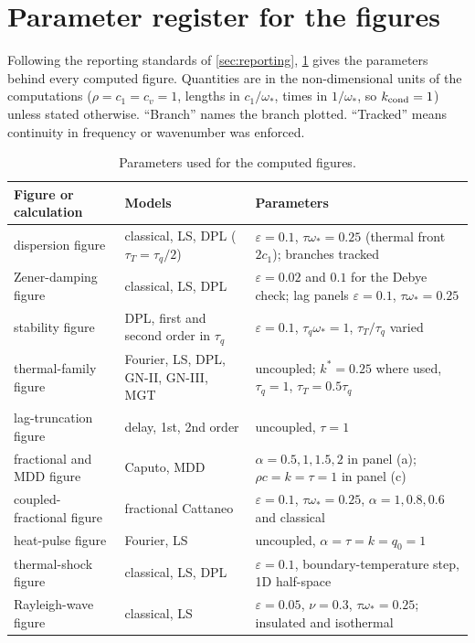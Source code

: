 \section{Parameter register for the figures}\label{app:params}

Following the reporting standards of \cref{sec:reporting}, \cref{tab:paramreg} gives the parameters behind every computed figure. Quantities are in the non-dimensional units of the computations ($\rho=c_1=c_v=1$, lengths in $c_1/\omega_*$, times in $1/\omega_*$, so $k_{\rm cond}=1$) unless stated otherwise. ``Branch'' names the branch plotted. ``Tracked'' means continuity in frequency or wavenumber was enforced.

\begin{table}[H]\centering\scriptsize
\caption{Parameters used for the computed figures.}\label{tab:paramreg}
\setlength{\tabcolsep}{3pt}
\begin{tabularx}{\textwidth}{@{}p{4.0cm}p{3.0cm}X@{}}\toprule
Figure or calculation & Models & Parameters\\\midrule
dispersion figure & classical, LS, DPL ($\tau_T=\tau_q/2$) & $\varepsilon=0.1$, $\tau\omega_*=0.25$ (thermal front $2c_1$); branches tracked\\
Zener-damping figure & classical, LS, DPL & $\varepsilon=0.02$ and $0.1$ for the Debye check; lag panels $\varepsilon=0.1$, $\tau\omega_*=0.25$\\
stability figure & DPL, first and second order in $\tau_q$ & $\varepsilon=0.1$, $\tau_q\omega_*=1$, $\tau_T/\tau_q$ varied\\
thermal-family figure & Fourier, LS, DPL, GN-II, GN-III, MGT & uncoupled; $k^*=0.25$ where used, $\tau_q=1$, $\tau_T=0.5\tau_q$\\
lag-truncation figure & delay, 1st, 2nd order & uncoupled, $\tau=1$\\
fractional and MDD figure & Caputo, MDD & $\alpha=0.5,1,1.5,2$ in panel (a); $\rho c=k=\tau=1$ in panel (c)\\
coupled-fractional figure & fractional Cattaneo & $\varepsilon=0.1$, $\tau\omega_*=0.25$, $\alpha=1,0.8,0.6$ and classical\\
heat-pulse figure & Fourier, LS & uncoupled, $\alpha=\tau=k=q_0=1$\\
thermal-shock figure & classical, LS, DPL & $\varepsilon=0.1$, boundary-temperature step, 1D half-space\\
Rayleigh-wave figure & classical, LS & $\varepsilon=0.05$, $\nu=0.3$, $\tau\omega_*=0.25$; insulated and isothermal\\

\end{tabularx}
\end{table}
